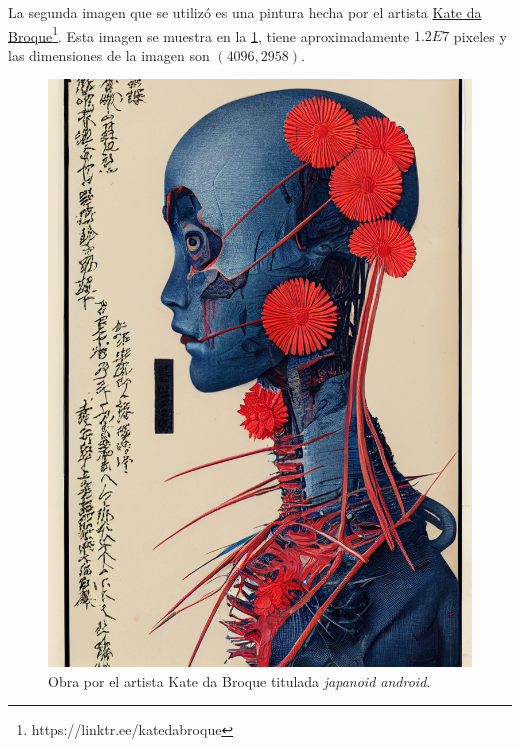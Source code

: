 La segunda imagen que se utilizó es una pintura hecha por el artista \href{https://twitter.com/DaBroque}{Kate da Broque}\footnote{https://linktr.ee/katedabroque}. Esta imagen se muestra en la \cref{fig:kate-da-broque}, tiene aproximadamente $1.2E7$ pixeles y las dimensiones de la imagen son $(4096, 2958)$.
\begin{figure}[ht!]
    \centering
    \includegraphics[scale=0.05]{../figures/kate-da-broque}
    \caption{Obra por el artista Kate da Broque titulada \textit{japanoid android}.}
    \label{fig:kate-da-broque}
\end{figure}

